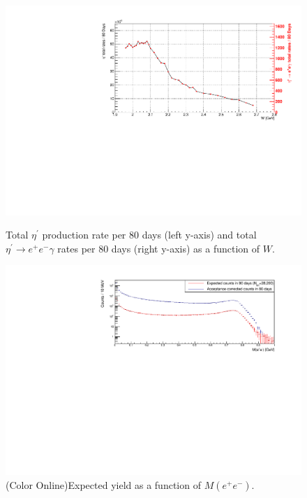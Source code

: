 \documentclass[11pt,a4paper,twocolumn]{article}
\newlength{\figwidth}
\newlength{\qfigheight}
\def\etaP{\eta^{\prime}}
\def\epem{e^+e^-}
\begin{document}
						
\begin{figure}[h!]\begin{center}
\includegraphics[width=1.0\figwidth,height=1.4\qfigheight]{figures/Total_rates.pdf}\\
\caption[etaP rates]{\label{fig:EtaPRate}{Total $\etaP$ production rate per 80 days (left y-axis) and total $\etaP\rightarrow \epem\gamma$ rates per 80 days (right y-axis) as a function of $W$. }}
\end{center}\end{figure}
							
\begin{figure}[h!]\begin{center}
\includegraphics[width=\figwidth,height=1.3\qfigheight]{figures/counts.pdf}
\caption[Acceptance as a function of $M(\epem)$]{\label{fig:counts}{(Color Online)Expected yield as a function of $M(\epem)$.}}
\end{center}\end{figure}
								
\end{document}
